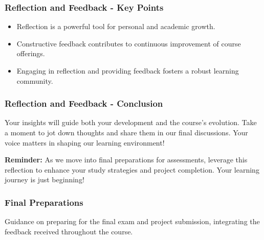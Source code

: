 \documentclass{beamer}
\begin{document}
\begin{frame}[fragile]
    \frametitle{Reflection and Feedback - Key Points}
    \begin{itemize}
        \item Reflection is a powerful tool for personal and academic growth.
        \item Constructive feedback contributes to continuous improvement of course offerings.
        \item Engaging in reflection and providing feedback fosters a robust learning community.
    \end{itemize}
\end{frame}

\begin{frame}[fragile]
    \frametitle{Reflection and Feedback - Conclusion}
    Your insights will guide both your development and the course's evolution. Take a moment to jot down thoughts and share them in our final discussions. Your voice matters in shaping our learning environment!

    \textbf{Reminder:} As we move into final preparations for assessments, leverage this reflection to enhance your study strategies and project completion. Your learning journey is just beginning!
\end{frame}

\begin{frame}[fragile]
    \frametitle{Final Preparations}
    Guidance on preparing for the final exam and project submission, integrating the feedback received throughout the course.
\end{frame}
\end{document}

